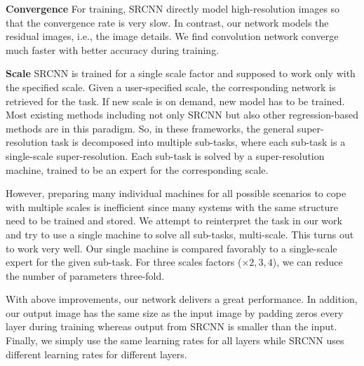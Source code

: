 \documentclass[10pt,twocolumn,letterpaper]{article}
\begin{document}
\textbf{Convergence}
For training, SRCNN directly model high-resolution images so that the convergence rate is very slow. In contrast, our network models the residual images, i.e., the image details. We find convolution network converge much faster with better accuracy during training.

\textbf{Scale} SRCNN is trained for a single scale factor and supposed to work only with the specified scale. Given a user-specified scale, the corresponding network is retrieved for the task. If new scale is on demand, new model has to be trained. Most existing methods including not only SRCNN but also other regression-based methods \cite{Timofte2013, Timofte, Yang2013} are in this paradigm. So, in these frameworks, the general super-resolution task is decomposed into multiple sub-tasks, where each sub-task is a single-scale super-resolution. Each sub-task is solved by a super-resolution machine, trained to be an expert for the corresponding scale. 

However, preparing many individual machines for all possible scenarios to cope with multiple scales is inefficient since many systems with the same structure need to be trained and stored.
We attempt to reinterpret the task in our work and try to use a single machine to solve all sub-tasks, multi-scale. This turns out to work very well. Our single machine is compared favorably to a single-scale expert for the given sub-task. For three scales factors ($\times 2,3,4$), we can reduce the number of parameters three-fold.


With above improvements, our network delivers a great performance. In addition, our output image has the same size as the input image by padding zeros every layer during training whereas output from SRCNN is smaller than the input. Finally, we simply use the same learning rates for all layers while SRCNN uses different learning rates for different layers.
\end{document}
